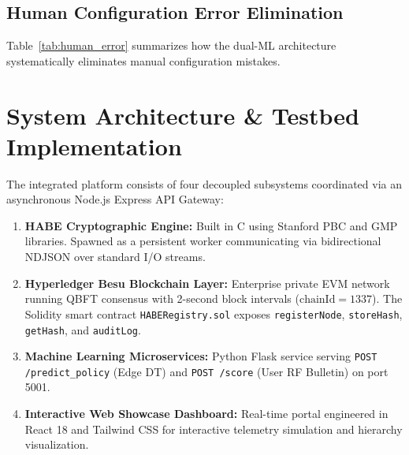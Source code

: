 \documentclass[conference]{IEEEtran}
\begin{document}
\subsection{Human Configuration Error Elimination}
Table~\ref{tab:human_error} summarizes how the dual-ML architecture systematically eliminates manual configuration mistakes.

\begin{table}[htbp]
\caption{Human Configuration Error Mitigation Analysis}
\label{tab:human_error}
\centering
{}
\end{table}

\section{System Architecture \& Testbed Implementation}
The integrated platform consists of four decoupled subsystems coordinated via an asynchronous Node.js Express API Gateway:
\begin{enumerate}
    \item \textbf{HABE Cryptographic Engine:} Built in C using Stanford PBC and GMP libraries. Spawned as a persistent worker communicating via bidirectional NDJSON over standard I/O streams.
    \item \textbf{Hyperledger Besu Blockchain Layer:} Enterprise private EVM network running QBFT consensus with 2-second block intervals ($\text{chainId}=1337$). The Solidity smart contract \texttt{HABERegistry.sol} exposes \texttt{registerNode}, \texttt{storeHash}, \texttt{getHash}, and \texttt{auditLog}.
    \item \textbf{Machine Learning Microservices:} Python Flask service serving \texttt{POST /predict\_policy} (Edge DT) and \texttt{POST /score} (User RF Bulletin) on port 5001.
    \item \textbf{Interactive Web Showcase Dashboard:} Real-time portal engineered in React 18 and Tailwind CSS for interactive telemetry simulation and hierarchy visualization.
\end{enumerate}
\end{document}
